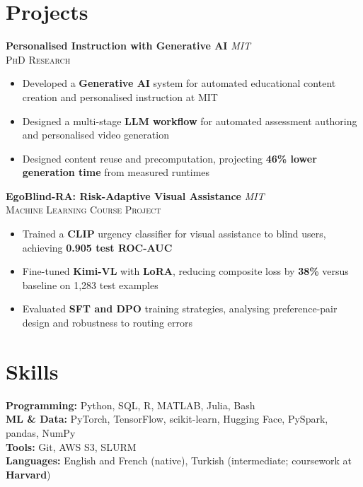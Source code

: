 \documentclass[10pt, letterpaper]{article}
\newenvironment{highlightsforbulletentries}{
    \begin{itemize}[
        topsep=0.05 cm,
        parsep=0.01 cm,
        partopsep=0pt,
        itemsep=0pt,
        leftmargin=10pt
    ]
}{
    \end{itemize}
} %
\newenvironment{onecolentry}{
    \begin{adjustwidth}{
    }{
    }
}{
    \end{adjustwidth}
} %
\let\hrefWithoutArrow\href
\renewcommand{\href}[2]{\hrefWithoutArrow{#1}{\ifthenelse{\equal{#2}{}}{ }{#2 }\raisebox{.15ex}{\footnotesize \faExternalLink*}}}
\begin{document}
\section{Projects}
 \begin{onecolentry}
    \textbf{Personalised Instruction with Generative AI}
    \hfill \textit{MIT}\\
    \textsc{PhD Research}
    \hfill \href{https://github.com/juliavekim/personalized_instruction}{GitHub}
    \begin{highlightsforbulletentries}
    \item Developed a \textbf{Generative AI} system for automated educational content creation and personalised instruction at MIT
    \item Designed a multi-stage \textbf{LLM workflow} for automated assessment authoring and personalised video generation
    \item Designed content reuse and precomputation, projecting \textbf{46\% lower generation time} from measured runtimes
\end{highlightsforbulletentries}
        \end{onecolentry}
\vspace{0.2cm}
\begin{onecolentry}
    \textbf{EgoBlind-RA: Risk-Adaptive Visual Assistance}
    \hfill \textit{MIT}\\
    \textsc{Machine Learning Course Project}
    \hfill \href{https://github.com/juliavekim/EgoBlind-RA}{GitHub}
    \begin{highlightsforbulletentries}
    \item Trained a \textbf{CLIP} urgency classifier for visual assistance to blind users, achieving \textbf{0.905 test ROC-AUC}
    \item Fine-tuned \textbf{Kimi-VL} with \textbf{LoRA}, reducing composite loss by \textbf{38\%} versus baseline on 1,283 test examples
    \item Evaluated \textbf{SFT and DPO} training strategies, analysing preference-pair design and robustness to routing errors
\end{highlightsforbulletentries}
\end{onecolentry}
\vspace{-0.1cm}
        \section{Skills}
        \begin{onecolentry}
    \textbf{Programming:} Python, SQL, R, MATLAB, Julia, Bash \\
    \textbf{ML \& Data:} PyTorch, TensorFlow, scikit-learn,
    Hugging Face, PySpark, pandas, NumPy \\
    \textbf{Tools:} Git, AWS S3, SLURM \\
    \textbf{Languages:} English and French (native),
    Turkish (intermediate; coursework at \textbf{Harvard})
\end{onecolentry}
\vspace{-0.1cm}
\end{document}
